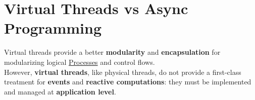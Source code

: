 \section{Virtual Threads vs Async Programming}\label{sec:rs_virtual_threads_vs_async_programming} %
Virtual threads provide a better \textbf{modularity} and \textbf{encapsulation} for modularizing logical \hyperref[def:process]{Processes} and control flows.
\\
However, \textbf{virtual threads}, like physical threads, do not provide a first-class treatment for \textbf{events} and \textbf{reactive computations}: they must be implemented and managed at \textbf{application level}.
